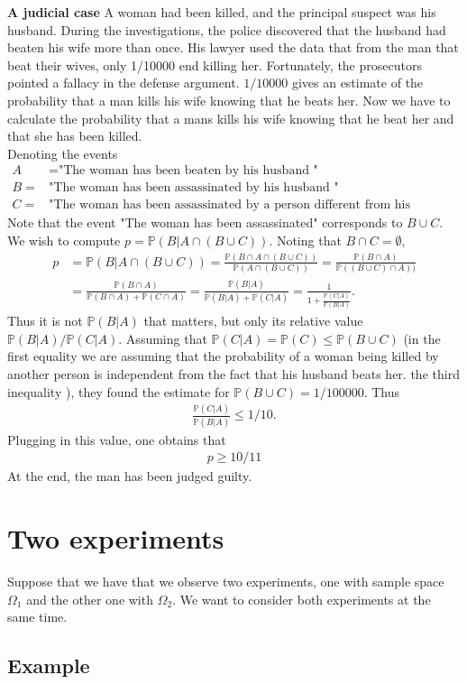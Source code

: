 \documentclass[12pt]{article}
\newcommand{\<}{{\langle \!\! \langle}}
\renewcommand{\>}{{\rangle \!\! \rangle}}
\newcommand{\bel}[2]{\begin{equation} \label{#1} \begin{split} #2
 					\end{split} \end{equation}}
\begin{document}
\textbf{A judicial case} A woman had been killed, and the principal suspect was his husband. During the investigations, the police discovered that the husband had beaten his wife more than once. His lawyer used the data that from the man that beat their wives, only 1/10000 end killing her. Fortunately, the prosecutors pointed a fallacy in the defense argument. $1/10000$ gives an estimate of the probability that a man kills his wife knowing that he beats her. Now we have to calculate the probability that a mans kills his wife knowing that he beat her and that she has been killed.\\
Denoting the events
\bel{}{
A &=\textrm{"The woman has been beaten by his husband  "}\\ B=&\textrm{"The woman has been assassinated by his husband  "} \\ C=&\textrm{"The woman has been assassinated by a person different from his husband "}}
Note that the event "The woman has been assassinated" corresponds to $B\cup C$. We wish to compute 
$p=\mathbb{P}(B\vert A\cap(B\cup C))$. Noting that $B\cap C=\emptyset,$
\bel{}{p& =\mathbb{P}(B\vert A\cap(B\cup C))=\frac{\mathbb{P}(B\cap A\cap (B\cup C))}{\mathbb{P}(A\cap (B\cup C))}=\frac{\mathbb{P}(B\cap A)}{\mathbb{P}((B\cup C)\cap A))}\\
 &=\frac{\mathbb{P}(B\cap A)}{\mathbb{P}(B\cap A)+\mathbb{P}(C\cap A)}=\frac{\mathbb{P}(B|A)}{\mathbb{P}(B|A)+\mathbb{P}(C|A)}=\frac{1}{1+\frac{\mathbb{P}(C|A)}{\mathbb{P}(B|A)}}.}
Thus it is not $\mathbb{P}(B|A)$ that matters, but only its relative value $\mathbb{P}(B|A)/\mathbb{P}(C|A)$. Assuming that $\mathbb{P}(C|A)=\mathbb{P}(C)\leq \mathbb{P}(B\cup C)$ (in the first equality we are assuming that the probability of a woman being killed by another person is independent from the fact that his husband beats her. the third inequality ), they found the estimate for $\mathbb{P}(B\cup C)=1/100000$. Thus \bel{}{\frac{\mathbb{P}(C|A)}{\mathbb{P}(B|A)}\leq 1/10.}
Plugging in this value, one obtains that
\bel{}{p\geq 10/11}
At the end, the man has been judged guilty. 


\section{Two experiments}

Suppose that we have that we observe two experiments, one with sample space $\Omega_1$ and the other one with $\Omega_2$. We want to consider both experiments at the same time. 

\subsection{ Example}
\end{document}
